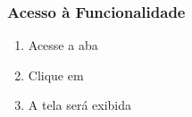 \documentclass[letterpaper,10pt,brazil]{sphinxmanual}
\begin{document}
\subsubsection{Acesso à Funcionalidade}
\label{\detokenize{projud_21_cadastrobempenhora:acesso-a-funcionalidade}}\begin{enumerate}
%
\item {} 
\sphinxAtStartPar
Acesse a aba 

\item {} 
\sphinxAtStartPar
Clique em 

\item {} 
\sphinxAtStartPar
A tela  será exibida

\end{enumerate}
\end{document}
